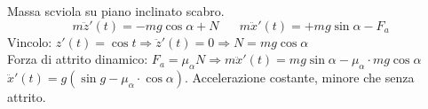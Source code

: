 \begin{example}
    Massa scviola su piano inclinato scabro.
    $$m\ddot{z}'(t) = -mg\cos\alpha + N \hspace{20pt} m\ddot{x}'(t) = +mg\sin\alpha - F_{a}$$
    Vincolo: $z'(t) = \cos t \Rightarrow \ddot{z}'(t) = 0 \Rightarrow N = mg\cos\alpha$\\
    Forza di attrito dinamico: $F_a = \mu_{\alpha}N \Rightarrow m\ddot{x}'(t) = mg\sin\alpha - \mu_{\alpha} \cdot mg\cos\alpha$\\
    $\ddot{x}'(t) = g(\sin g - \mu_{\alpha} \cdot \cos \alpha)$. Accelerazione costante, minore che senza attrito.
\end{example}